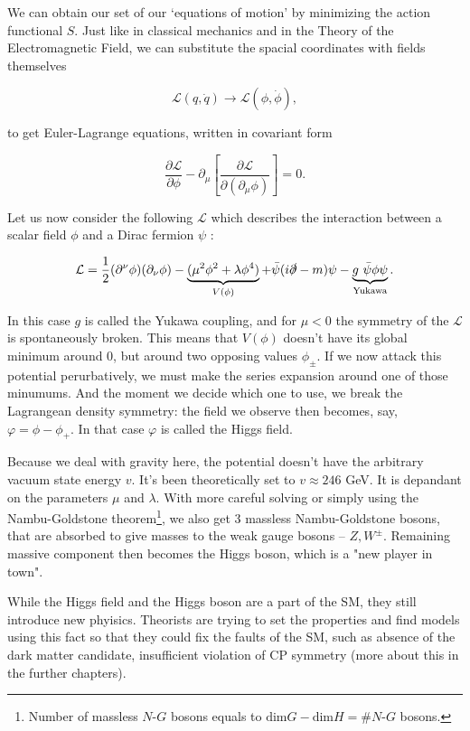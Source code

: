 We can obtain our set of our `equations of motion' by minimizing the action functional $S$. Just like in classical mechanics and in
the Theory of the Electromagnetic Field, we can substitute the spacial coordinates with fields themselves

\[
	\mathcal{L}(q,\dot{q}) \longrightarrow \mathcal{L}(\phi,\dot{\phi}),
\]

to get Euler-Lagrange equations, written in covariant form

\begin{equation}
	\frac{\partial\mathcal{L}}{\partial\phi} - \partial_\mu\left[\frac{\partial\mathcal{L}}{\partial(\partial_\mu\phi)}\right]
		= 0.
\end{equation}

Let us now consider the following $\mathcal{L}$ which describes the interaction between a scalar field $\phi$ and a Dirac fermion
$\psi$ \cite{wikipedia}:

\begin{equation}
	\mathcal{L} = \frac{1}{2}(\partial^\nu\phi)(\partial_\nu\phi) - \underbrace{(\mu^2\phi^2 + \lambda\phi^4)}_{V(\phi)} +
	\bar{\psi}(i\slashed{\partial} - m)\psi - \underbrace{g\ \bar{\psi}\phi\psi}_\text{Yukawa}.
\end{equation}

In this case $g$ is called the Yukawa coupling, and for $\mu < 0$ the symmetry of the $\mathcal{L}$ is spontaneously broken. This
means that $V(\phi)$ doesn't have its global minimum around 0, but around two opposing values $\phi_\pm$. If we now attack this
potential perurbatively, we must make the series expansion around one of those minumums. And the moment we decide which one to use,
we break the Lagrangean density symmetry: the field we observe then becomes, say, $\varphi = \phi - \phi_+$. In that case $\varphi$ is
called the Higgs field.

Because we deal with gravity here, the potential doesn't have the arbitrary vacuum state energy $v$. It's been theoretically set to
$v \approx 246$ GeV. It is depandant on the parameters $\mu$ and $\lambda$.
With more careful solving or simply using the Nambu-Goldstone theorem\footnote{Number of massless $N$-$G$ bosons equals to
$\text{dim} G - \text{dim} H = \# N\text{-}G$ bosons.}, we also get 3 massless Nambu-Goldstone bosons, that are absorbed to give
masses to the weak gauge bosons -- $Z, W^\pm$. Remaining massive component then becomes the Higgs boson, which is a "new player in
town".
\vspace{12pt}

While the Higgs field and the Higgs boson are a part of the SM, they still introduce new phyisics. Theorists are trying to set the
properties and find models using this fact so that they could fix the faults of the SM, such as absence of the dark matter candidate,
insufficient violation of CP symmetry (more about this in the further chapters).

